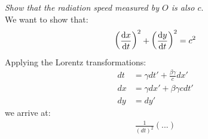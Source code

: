 \documentclass[../template.tex]{subfiles}
\begin{document}
\textit{Show that the radiation speed measured by $O$ is also $c$}.\\

We want to show that:
\begin{align*}
    \left(\dv{x}{t} \right)^2 + \left(\dv{y}{t} \right)^2 = c^2
\end{align*}
Applying the Lorentz transformations:
\begin{align*}
    dt &= \gamma dt' + \frac{\beta \gamma}{c} dx' \\
    dx &= \gamma dx' + \beta \gamma c dt' \\
    dy &= dy'
\end{align*}
we arrive at:
\begin{align*}
    \frac{1}{(dt)^2} \left(...\right)
\end{align*}
\end{document}
